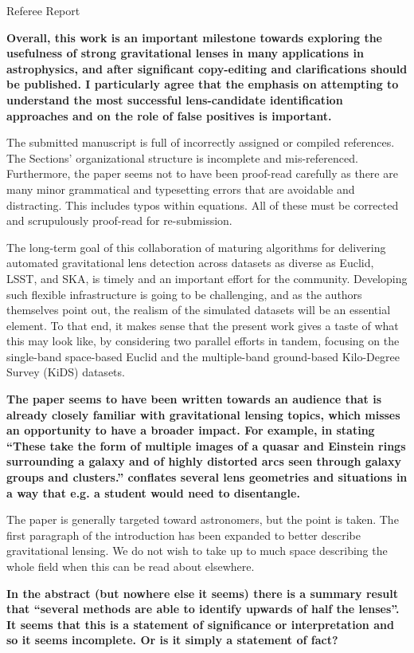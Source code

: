\documentclass[11pt,a4paper]{article}
\author{R.B. Metcalf}
\begin{document}
Referee Report

{\bf 
Overall, this work is an important milestone towards exploring the usefulness of strong gravitational lenses in many applications in astrophysics, and after significant copy-editing and clarifications should be published.  I particularly agree that the emphasis on attempting to understand the most successful lens-candidate identification approaches and on the role of false positives is important. 

The submitted manuscript is full of incorrectly assigned or compiled references.  The Sections’ organizational structure is incomplete and mis-referenced. Furthermore, the paper seems not to have been proof-read carefully as there are many minor grammatical and typesetting errors that are avoidable and distracting.  This includes typos within equations.  All of these must be corrected and scrupulously proof-read for re-submission.  

The long-term goal of this collaboration of maturing algorithms for delivering automated gravitational lens detection across datasets as diverse as Euclid, LSST, and SKA, is timely and an important effort for the community.  Developing such flexible infrastructure is going to be challenging, and as the authors themselves point out, the realism of the simulated datasets will be an essential element. To that end, it makes sense that the present work gives a taste of what this may look like, by considering two parallel efforts in tandem, focusing on the single-band space-based Euclid and the multiple-band ground-based Kilo-Degree Survey (KiDS) datasets. 
}

{\bf
The paper seems to have been written towards an audience that is already closely familiar with gravitational lensing topics, which misses an opportunity to have a broader impact. For example, in stating “These take the form of multiple images of a quasar and Einstein rings surrounding a galaxy and of highly distorted arcs seen through galaxy groups and clusters.” conflates several lens geometries and situations in a way that e.g. a student would need to disentangle. 
}

The paper is generally targeted toward astronomers, but the point is taken.  The first paragraph of the introduction has been expanded to better describe gravitational lensing.  We do not wish to take up to much space describing the whole field when this can be read about elsewhere.

{\bf
In the abstract (but nowhere else it seems) there is a summary result that “several methods are able to identify upwards of half the lenses”.  It seems that this is a statement of significance or interpretation and so it seems incomplete.  Or is it simply a statement of fact? 
}
\end{document}
